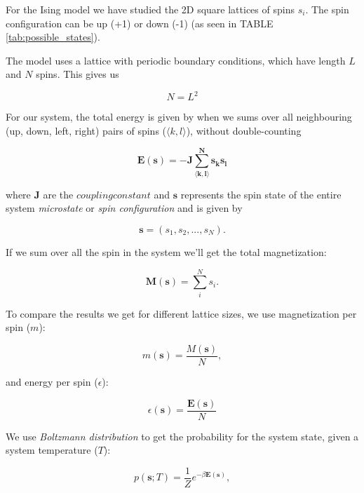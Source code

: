 \documentclass[english,notitlepage,reprint,nofootinbib]{revtex4-1}  %
\begin{document}
For the Ising model we have studied the 2D square lattices of spins $s_i$. The spin configuration can be up (+1) or down (-1) (as seen in TABLE \ref{tab:possible_states}).

The model uses a lattice with periodic boundary conditions, which have length $L$ and $N$ spins. This gives us

\begin{equation}
    N = L^2
\end{equation}

For our system, the total energy is given by when we sums over all neighbouring (up, down, left, right) pairs of spins ($\langle k,l\rangle $), without double-counting

\begin{equation} \label{eq:tot_energy}
    \mathbf{E(\mathbf{s}) = -J\sum\limits_{\langle k,l\rangle}^Ns_ks_l}
\end{equation}

where $\mathbf{J}$ are the $\mathit{coupling constant}$ and $\mathbf{s}$ represents the spin state of the entire system \textit{microstate} or \textit{spin configuration} and is given by 

\begin{equation}
    \mathbf{s} = \left( s_1, s_2, ... , s_N \right).
\end{equation}

If we sum over all the spin in the system we'll get the total magnetization:

\begin{equation}
    \mathbf{M} (\mathbf{s}) = \sum\limits_i^N s_i.
\end{equation}

To compare the results we get for different lattice sizes, we use magnetization per spin ($m$): 

\begin{equation}
    m (\mathbf{s}) = \frac{M(\mathbf{s})}{N},
\end{equation}

and energy per spin ($\epsilon$):

\begin{equation}
    \epsilon (\mathbf{s}) = \frac{\mathbf{E}(\mathbf{s})}{N}
\end{equation}

We use \textit{Boltzmann distribution} to get the probability for the system state, given a system temperature ($T$):

\begin{equation}
    p(\mathbf{s} ; T) = \frac{1}{Z} e^{- \beta \mathbf{E}(\mathbf{s})},
\end{equation}
\end{document}
